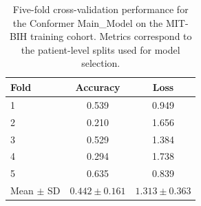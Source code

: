 \begin{table}[t]
  \centering
  \caption{Five-fold cross-validation performance for the Conformer Main\_Model on the MIT-BIH training cohort. Metrics correspond to the patient-level splits used for model selection.}
  \label{tab:cv-main-model}
  \begin{tabular}{lcc}
    \toprule
    Fold & Accuracy & Loss \\
    \midrule
    1 & 0.539 & 0.949 \\
    2 & 0.210 & 1.656 \\
    3 & 0.529 & 1.384 \\
    4 & 0.294 & 1.738 \\
    5 & 0.635 & 0.839 \\
    \midrule
    Mean $\pm$ SD & $0.442 \pm 0.161$ & $1.313 \pm 0.363$ \\
    \bottomrule
  \end{tabular}
\end{table}
